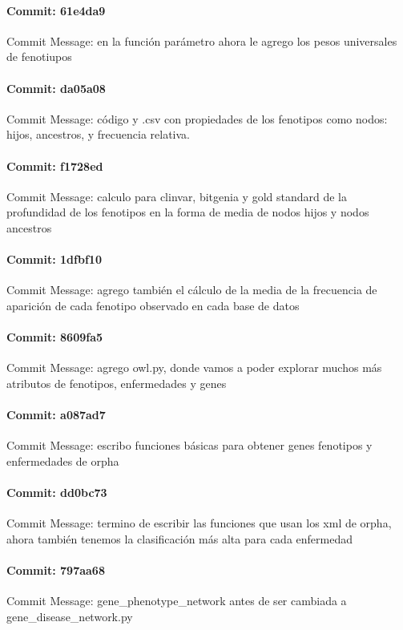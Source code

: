 \documentclass{article}
\begin{document}
\paragraph{Commit: 61e4da9}
Commit Message: en la función parámetro ahora le agrego los pesos universales de fenotiupos

\paragraph{Commit: da05a08}
Commit Message: código y .csv con propiedades de los fenotipos como nodos: hijos, ancestros, y frecuencia relativa.

\paragraph{Commit: f1728ed}
Commit Message: calculo para clinvar, bitgenia y gold standard de la profundidad de los fenotipos en la forma de media de nodos hijos y nodos ancestros

\paragraph{Commit: 1dfbf10}
Commit Message: agrego también el cálculo de la media de la frecuencia de aparición de cada fenotipo observado en cada base de datos

\paragraph{Commit: 8609fa5}
Commit Message: agrego owl.py, donde vamos a poder explorar muchos más atributos de fenotipos, enfermedades y genes

\paragraph{Commit: a087ad7}
Commit Message: escribo funciones básicas para obtener genes fenotipos y enfermedades de orpha

\paragraph{Commit: dd0bc73}
Commit Message: termino de escribir las funciones que usan los xml de orpha, ahora también tenemos la clasificación más alta para cada enfermedad

\paragraph{Commit: 797aa68}
Commit Message: gene_phenotype_network antes de ser cambiada a gene_disease_network.py
\end{document}
